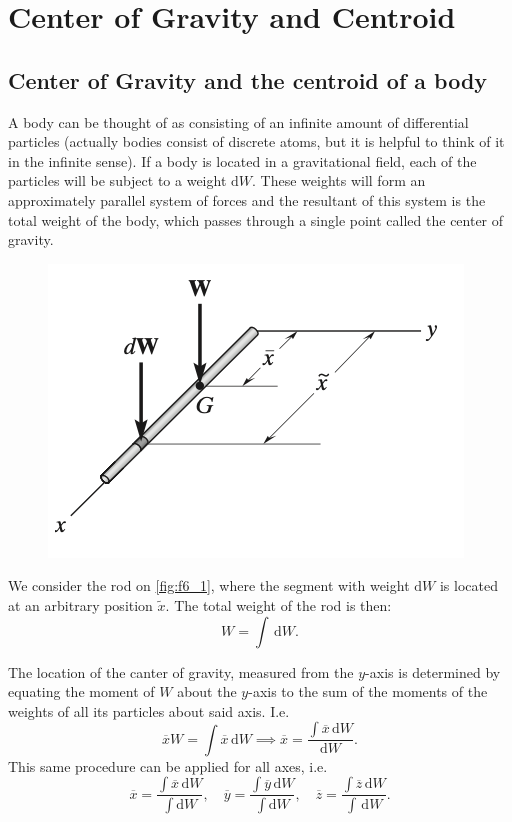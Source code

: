 
\section{Center of Gravity and Centroid}

\subsection{Center of Gravity and the centroid of a body}
A body can be thought of as consisting of an infinite amount of differential particles (actually bodies consist of discrete atoms, but it is helpful to think of it in the infinite sense). If a body is located in a gravitational field, each of the particles will be subject to a weight $\mathrm{d}W$. These weights will form an approximately parallel system of forces and the resultant of this system is the total weight of the body, which passes through a single point called the center of gravity.

\begin{figure} [ht]
  \centering
  \includegraphics[width=0.5\linewidth]{./figures/f6_1.png}
  \caption{}
  \label{fig:f6_1}
\end{figure}

We consider the rod on \autoref{fig:f6_1}, where the segment with weight $\mathrm{d}W$ is located at an arbitrary position $\tilde{x}$. The total weight of the rod is then:
\[ 
W = \int \, \mathrm{d}W
.\]

The location of the canter of gravity, measured from the $y$-axis is determined by equating the moment of $W$ about the $y$-axis to the sum of the moments of the weights of all its particles about said axis. I.e.
\[ 
\overline{x} W = \int \overline{x} \, \mathrm{d}W \implies \overline{x} = \frac{\int  \overline{x} \, \mathrm{d}W}{\mathrm{d}W}
.\]
This same procedure can be applied for all axes, i.e.
\[ 
\overline{x} = \frac{\int \overline{x}\, \mathrm{d}W}{\int \mathrm{d}W}, \quad \overline{y} = \frac{\int \overline{y} \, \mathrm{d}W}{\int  \mathrm{d}W}, \quad \overline{z} = \frac{\int \overline{z} \, \mathrm{d}W}{\int \, \mathrm{d}W}
.\]


